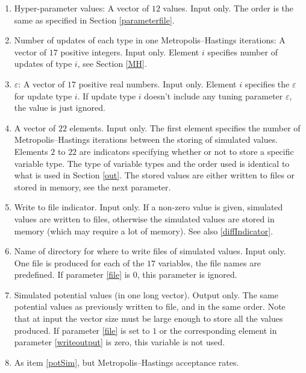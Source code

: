 \documentclass[11pt]{article}
\begin{document}
\begin{enumerate}
\item Hyper-parameter values: A vector of $12$ values. Input only. The order is the same 
as specified in Section \ref{parameterfile}.

\item Number of updates of each type in one Metropolis--Hastings iterations: A vector of 
$17$ positive integers. Input only. Element $i$ specifies number of updates of type $i$, 
see Section \ref{MH}.

\item $\varepsilon$: A vector of $17$ positive real numbers. Input only. Element $i$ 
specifies the $\varepsilon$ for update type $i$. If update type $i$ doesn't include 
any tuning parameter $\varepsilon$, the value is just ignored.

\item \label{writeoutput}A vector of $22$ elements. Input only. The first element specifies the number of 
Metropolis--Hastings iterations between the storing of simulated values. Elements
$2$ to $22$ are indicators specifying whether or not to store a specific variable type.
The type of variable types and the order used is identical to what is used 
in Section \ref{out}. The stored values are either written to files or 
stored in memory, see the next parameter.

\item \label{file}Write to file indicator. Input only. If a non-zero value is given, simulated values
are written to files, otherwise the simulated values are stored in memory (which may 
require a lot of memory). See also \ref{diffIndicator}.

\item Name of directory for where to write files of simulated values. Input only. One file is produced
for each of the $17$ variables, the file names are predefined. If parameter \ref{file} is
$0$, this parameter is ignored.

\item \label{potSim}Simulated potential values (in one long vector). Output only. 
The same potential values as previously written 
to file, and in the same order. Note that at input the vector size must be large enough to 
store all the values produced. If parameter \ref{file} is set to $1$ or the corresponding
element in parameter \ref{writeoutput} is zero, this variable is not 
used.

\item As item \ref{potSim}, but Metropolis--Hastings acceptance rates.


\end{enumerate}
\end{document}
